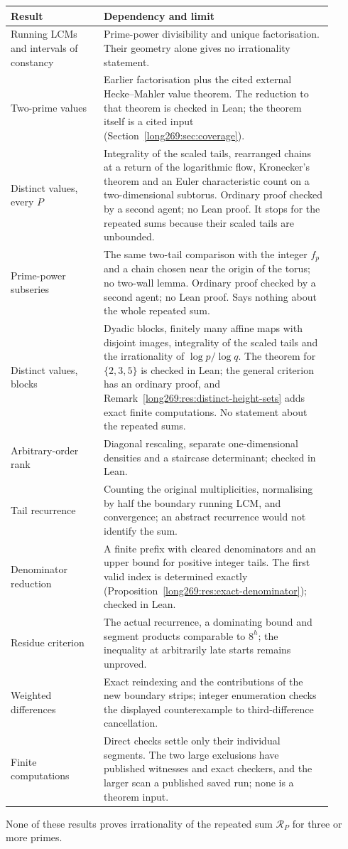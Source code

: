 \documentclass[11pt]{article}
\theoremstyle{remark}
\theoremstyle{plain}
\begin{document}
\begin{center}\small
\begin{tabular}{p{0.26\linewidth}p{0.64\linewidth}}
\hline
Result & Dependency and limit\\\hline
Running LCMs and intervals of constancy & Prime-power divisibility and unique factorisation.
Their geometry alone gives no irrationality statement.\\
Two-prime values & Earlier factorisation plus the cited external
Hecke--Mahler value theorem.  The reduction to that theorem is checked in
Lean; the theorem itself is a cited input (Section~\ref{long269:sec:coverage}).\\
Distinct values, every $P$ & Integrality of the scaled tails,
rearranged chains at a return of the logarithmic flow, Kronecker's theorem
and an Euler characteristic count on a two-dimensional subtorus.  Ordinary
proof checked by a second agent; no Lean proof.  It stops for the repeated sums because
their scaled tails are unbounded.\\
Prime-power subseries & The same two-tail comparison with the integer $f_p$
and a chain chosen near the origin of the torus; no two-wall lemma.
Ordinary proof checked by a second agent; no Lean proof.  Says nothing about the whole
repeated sum.\\
Distinct values, blocks & Dyadic blocks, finitely many affine maps with
disjoint images, integrality of the scaled tails and the irrationality of
$\log p/\log q$.  The theorem for $\{2,3,5\}$ is checked in Lean; the
general criterion has an ordinary proof, and
Remark~\ref{long269:res:distinct-height-sets} adds exact finite
computations.  No statement about the repeated sums.\\
Arbitrary-order rank & Diagonal rescaling, separate one-dimensional
densities and a staircase determinant; checked in Lean.\\
Tail recurrence & Counting the original multiplicities, normalising by
half the boundary running LCM, and convergence; an abstract recurrence would
not identify the sum.\\
Denominator reduction & A finite prefix with cleared denominators and
an upper bound for positive integer tails.  The first valid index is
determined exactly (Proposition~\ref{long269:res:exact-denominator}); checked
in Lean.\\
Residue criterion & The actual recurrence, a dominating bound and segment
products comparable to $8^h$; the inequality at arbitrarily late starts remains
unproved.\\
Weighted differences & Exact reindexing and the contributions of the
new boundary strips; integer enumeration checks the displayed
counterexample to third-difference cancellation.\\
Finite computations & Direct checks settle only their individual
segments.  The two large exclusions have published witnesses and exact
checkers, and the larger scan a published saved run; none is a theorem
input.\\\hline
\end{tabular}
\end{center}
None of these results proves irrationality of the repeated sum
$\mathcal R_P$ for three or more primes.
\end{document}
